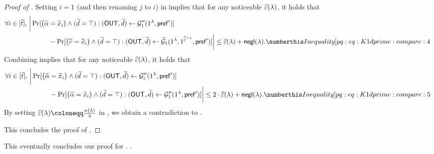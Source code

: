 \begin{proof}[Proof of ]
Setting $i = 1$ (and then renaming $j$ to $i$) in  implies that for any noticeable $\widehat{\varepsilon}(\lambda)$, it holds that
    \begin{align*}
        \forall i \in [\tilde{t}],~& \bigg| \Pr[\big( \tilde{\alpha} = \tilde{x}_i \big)\wedge (\tilde{d} = \top): (\OUT,\tilde{d}) \gets \mcal{G}_1''(1^\secpar, \msf{pref'})] \\
         &\hspace{3em} - \Pr[\big( \tilde{v} = \tilde{x}_i \big)\wedge (\tilde{d} = \top): (\OUT, \tilde{d}) \gets \mcal{\hat{G}}_1(1^\secpar, 1^{\hat{\epsilon}^{-1}}, \msf{pref'})] \bigg| 
         \leq \hat{\epsilon}(\secpar) +  \negl(\secpar). \numberthis \label[Inequality]{pq:eq:K1dprime:compare:4}
    \end{align*} 
Combining  implies that for any noticeable $\widehat{\varepsilon}(\lambda)$, it holds that
    \begin{align*}
        \forall i \in [\tilde{t}],~& \bigg| \Pr[\big( \tilde{\alpha} = \tilde{x}_i \big)\wedge (\tilde{d} = \top): (\OUT,\tilde{d}) \gets \mcal{G}_i''(1^\secpar, \msf{pref'})] \\
         &\hspace{3em} - \Pr[\big( \tilde{\alpha} = \tilde{x}_i \big)\wedge (\tilde{d} = \top): (\OUT,\tilde{d}) \gets \mcal{G}_1''(1^\secpar, \msf{pref'})] \bigg| 
         \leq 2\cdot\hat{\epsilon}(\secpar) +  \negl(\secpar). \numberthis \label[Inequality]{pq:eq:K1dprime:compare:5}
    \end{align*}
By setting $\hat{\epsilon}(\secpar) \coloneqq \frac{\kappa(\secpar)}{4}$ in , we obtain a contradiction to .

This concludes the proof of .

\end{proof}





This eventually concludes our proof for . 
    . 




